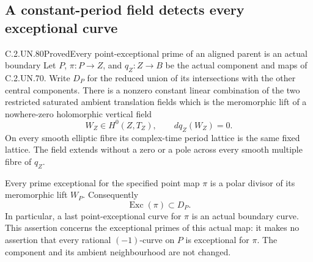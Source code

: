 \subsection{A constant-period field detects every exceptional curve}

\begin{statement}{C.2.UN.80}{Proved}{Every point-exceptional prime of an aligned parent is an actual boundary}
Let \(P\), \(\pi:P\to Z\), and \(q_Z:Z\to B\) be the
actual component and maps of C.2.UN.70. Write \(D_P\)
for the reduced union of its intersections with the
other central components. There is a nonzero constant
linear combination of the two restricted saturated
ambient translation fields which is the meromorphic
lift of a nowhere-zero holomorphic vertical field
\[
 W_Z\in H^0(Z,T_Z),\qquad dq_Z(W_Z)=0.
 \tag{C.PF.1}
\]
On every smooth elliptic fibre its complex-time period
lattice is the same fixed lattice. The field extends
without a zero or a pole across every smooth multiple
fibre of \(q_Z\).

Every prime exceptional for the specified point map
\(\pi\) is a polar divisor of its meromorphic lift
\(W_P\). Consequently
\[
                 \operatorname{Exc}(\pi)\subset D_P.
 \tag{C.PF.2}
\]
In particular, a last point-exceptional curve for
\(\pi\) is an actual boundary curve. This assertion
concerns the exceptional primes of this actual map:
it makes no assertion that every rational
\((-1)\)-curve on \(P\) is exceptional for \(\pi\).
The component and its ambient neighbourhood are not
changed.
\end{statement}

